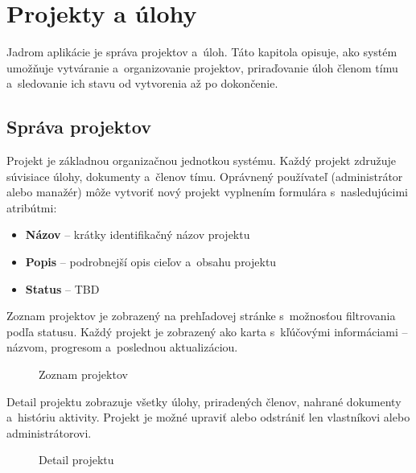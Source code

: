 \chapter{Projekty a úlohy}

        Jadrom aplikácie je správa projektov a~úloh. Táto kapitola opisuje,
ako systém umožňuje vytváranie a~organizovanie projektov, priraďovanie úloh
členom tímu a~sledovanie ich stavu od vytvorenia až po dokončenie.

\section{Správa projektov}

        Projekt je základnou organizačnou jednotkou systému. Každý projekt združuje
súvisiace úlohy, dokumenty a~členov tímu. Oprávnený používateľ (administrátor
alebo manažér) môže vytvoriť nový projekt vyplnením formulára s~nasledujúcimi
atribútmi:

\begin{itemize}
  \item \textbf{Názov} -- krátky identifikačný názov projektu
  \item \textbf{Popis} -- podrobnejší opis cieľov a~obsahu projektu
  \item \textbf{Status} -- TBD
\end{itemize}

        Zoznam projektov je zobrazený na prehľadovej stránke s~možnosťou filtrovania
podľa statusu. Každý projekt je zobrazený ako karta s~kľúčovými
informáciami -- názvom, progresom a~poslednou aktualizáciou.

\begin{figure}[H]
  \centering
  \caption{Zoznam projektov}
  \label{fig:projekty}
\end{figure}

        Detail projektu zobrazuje všetky úlohy, priradených členov, nahrané dokumenty
a~históriu aktivity. Projekt je možné upraviť alebo odstrániť len vlastníkovi
alebo administrátorovi.

\begin{figure}[H]
  \centering
  \caption{Detail projektu}
  \label{fig:detail_projektu}
\end{figure}

